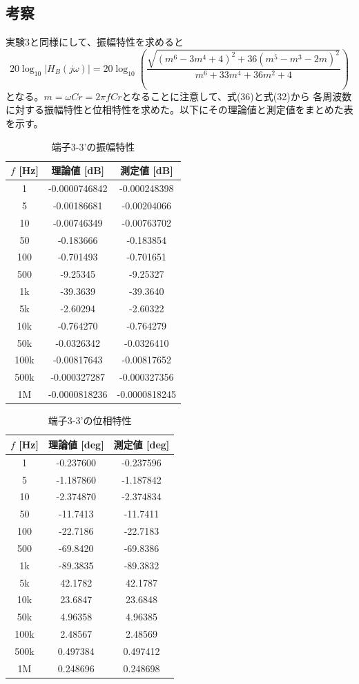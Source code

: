 \documentclass[article]{jlreq}
\begin{document}
\subsection{考察}
実験3と同様にして、振幅特性を求めると
\begin{equation}
20\log_{10}\left|H_B(j\omega)\right|
= 20\log_{10}\left(\frac{\sqrt{(m^6-3m^4+4)^{2}+36(m^5-m^3-2m)^{2}}}
{m^6+33m^4+36m^2+4}\right)
\end{equation}
となる。$m = \omega Cr = 2\pi fCr $となることに注意して、式(36)と式(32)から
各周波数に対する振幅特性と位相特性を求めた。以下にその理論値と測定値をまとめた表を示す。
  \begin{table}[H]
\centering
\caption{端子3-3'の振幅特性}
\begin{tabular}{ccc}
\hline
$f$ [Hz] & 理論値 [dB] & 測定値 [dB] \\
\hline
1       & -0.0000746842 & -0.000248398 \\
5       & -0.00186681   & -0.00204066 \\
10      & -0.00746349   & -0.00763702 \\
50      & -0.183666     & -0.183854 \\
100     & -0.701493     & -0.701651 \\
500     & -9.25345      & -9.25327 \\
1k      & -39.3639      & -39.3640 \\
5k      & -2.60294      & -2.60322 \\
10k     & -0.764270     & -0.764279 \\
50k     & -0.0326342    & -0.0326410 \\
100k    & -0.00817643   & -0.00817652 \\
500k    & -0.000327287  & -0.000327356 \\
1M      & -0.0000818236 & -0.0000818245 \\
\hline
\end{tabular}
\end{table}
\begin{table}[H]
\centering
\caption{端子3-3'の位相特性}
\begin{tabular}{ccc}
\hline
$f$ [Hz] & 理論値 [deg] & 測定値 [deg] \\
\hline
1       & -0.237600 & -0.237596 \\
5       & -1.187860 & -1.187842 \\
10      & -2.374870 & -2.374834 \\
50      & -11.7413  & -11.7411 \\
100     & -22.7186  & -22.7183 \\
500     & -69.8420  & -69.8386 \\
1k      & -89.3835  & -89.3832 \\
5k      & 42.1782   & 42.1787 \\
10k     & 23.6847   & 23.6848 \\
50k     & 4.96358   & 4.96385 \\
100k    & 2.48567   & 2.48569 \\
500k    & 0.497384  & 0.497412 \\
1M      & 0.248696  & 0.248698 \\
\hline
\end{tabular}
\end{table}
\end{document}

